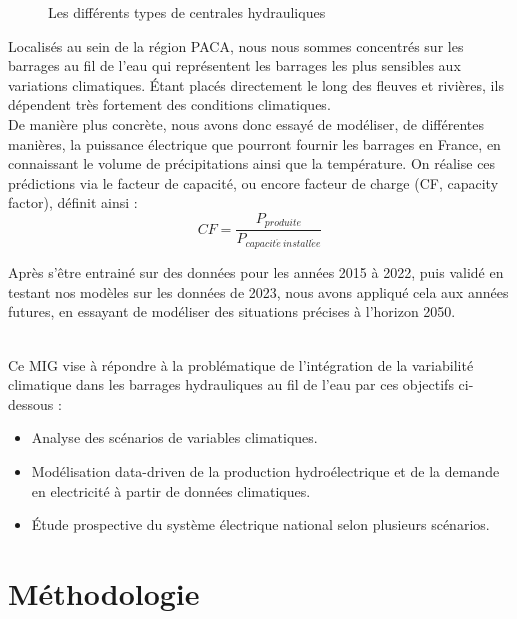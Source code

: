 \documentclass{article}
\theoremstyle{nopointbreak}
\theoremstyle{nobrkbold}
\begin{document}
\begin{itemize}
\begin{figure}[h!]
    \caption{Les différents types de centrales hydrauliques}
    \label{fig:Barrages}
\end{figure}

\end{itemize}

\newpage

Localisés au sein de la région PACA, nous nous sommes concentrés sur les barrages au fil de l'eau qui représentent les barrages les plus sensibles aux variations climatiques.
Étant placés directement le long des fleuves et rivières, ils dépendent très fortement des conditions climatiques. \\


De manière plus concrète, nous avons donc essayé de modéliser, de différentes manières, la puissance électrique que pourront fournir les barrages en France, en connaissant le volume de précipitations ainsi que la température. On réalise ces prédictions via le facteur de capacité, ou encore facteur de charge (CF, capacity factor), définit ainsi : \\ $$ CF = \frac{P_{produite}}{P_{capacit\acute e \ install\acute ee}}$$

Après s’être entrainé sur des données pour les années 2015 à 2022, puis validé en testant nos modèles sur les données de 2023, nous avons appliqué cela aux années futures, en essayant de modéliser des situations précises à l’horizon 2050. 

\\

Ce MIG vise à répondre à la problématique de l'intégration de la variabilité climatique dans les barrages hydrauliques au fil de l'eau par ces objectifs ci-dessous : 
\begin{itemize}
    \item Analyse des scénarios de variables climatiques.
    \item Modélisation data-driven de la production hydroélectrique et de la demande en electricité à partir de données climatiques.
    \item Étude prospective du système électrique national selon plusieurs scénarios.
\end{itemize}



\newpage

\section{Méthodologie }
\end{document}
